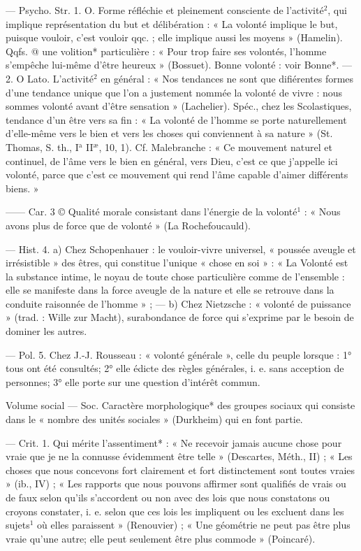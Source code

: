 \begin{itemize}[leftmargin=1cm, label=, itemsep=1pt]
 — Psycho. Str. 1. O. Forme
réfléchie et pleinement consciente de
l’activité$^2$, qui implique représentation du but et délibération : « La
volonté implique le but, puisque
vouloir, c’est vouloir qqc. ; elle implique aussi les moyens » (Hamelin).
Qqfs. @ une volition* particulière :
« Pour trop faire ses volontés,
l’homme s’empêche lui-même d’être
heureux » (Bossuet). Bonne volonté :
voir Bonne*. — 2. O Lato. L'activité$^2$
en général : « Nos tendances ne sont
que difiérentes formes d’une tendance unique que l’on a justement
nommée la volonté de vivre : nous
sommes volonté avant d'être sensation » (Lachelier). Spéc., chez les
Scolastiques, tendance d’un être vers
sa fin : « La volonté de l’homme se
porte naturellement d'elle-même
vers le bien et vers les choses qui
conviennent à sa nature » (St. Thomas, S. th., I$^\text{a}$ II$^\text{æ}$, 10, 1). Cf. Malebranche : « Ce mouvement naturel
et continuel, de l'âme vers le bien
en général, vers Dieu, c’est ce que
j'appelle ici volonté, parce que c’est
ce mouvement qui rend l'âme capable d'aimer différents biens. »

—— Car. 3 © Qualité morale
consistant dans l'énergie de la volonté$^1$ : « Nous avons plus de force
que de volonté » (La Rochefoucauld).

— Hist. 4. a) Chez Schopenhauer :
le vouloir-vivre universel, « poussée
aveugle et irrésistible » des êtres, qui
constitue l’unique « chose en soi » :
« La Volonté est la substance intime,
le noyau de toute chose particulière
comme de l’ensemble : elle se manifeste dans la force aveugle de la
nature et elle se retrouve dans la
conduite raisonnée de l’homme » ; —
b) Chez Nietzsche : « volonté de puissance » (trad. : Wille zur Macht),
surabondance de force qui s'exprime
par le besoin de dominer les autres.

— Pol. 5. Chez J.-J. Rousseau :
« volonté générale », celle du peuple
lorsque : 1° tous ont été consultés;
2° elle édicte des règles générales,
i. e. sans acception de personnes;
3° elle porte sur une question d’intérêt commun.

Volume social\ib{} — Soc. Caractère morphologique* des groupes sociaux
qui consiste dans le « nombre des
unités sociales » (Durkheim) qui en
font partie.

 — Crit. 1. Qui mérite l’assentiment* : « Ne recevoir jamais aucune
chose pour vraie que je ne la connusse évidemment être telle » (Descartes, Méth., II) ; « Les choses que
nous concevons fort clairement et
fort distinctement sont toutes
vraies » (ib., IV) ; « Les rapports que
nous pouvons affirmer sont qualifiés de vrais ou de faux selon qu'ils
s’accordent ou non avec des lois que
nous constatons ou croyons constater, i. e. selon que ces lois les impliquent ou les excluent dans les
sujets$^1$ où elles paraissent » (Renouvier) ; « Une géométrie ne peut pas
être plus vraie qu’une autre; elle
peut seulement être plus commode »
(Poincaré).


\end{itemize}
